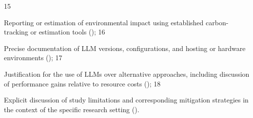 \begin{enumerate*}[label=(\arabic*)]
15\item Reporting or estimation of environmental impact using established carbon-tracking or estimation tools (\may);
16\item Precise documentation of LLM versions, configurations, and hosting or hardware environments (\must);
17\item Justification for the use of LLMs over alternative approaches, including discussion of performance gains relative to resource costs (\must);
18\item Explicit discussion of study limitations and corresponding mitigation strategies in the context of the specific research setting (\should).
\end{enumerate*}

